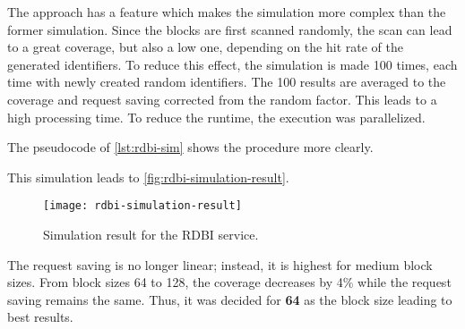 The approach has a feature which makes the simulation more complex than the former simulation. Since the blocks are first scanned randomly, the scan can lead to a great coverage, but also a low one, depending on the hit rate of the generated identifiers. To reduce this effect, the simulation is made 100 times, each time with newly created random identifiers. The 100 results are averaged to the coverage and request saving corrected from the random factor. This leads to a high processing time. To reduce the runtime, the execution was parallelized.

The pseudocode of \autoref{lst:rdbi-sim} shows the procedure more clearly.


This simulation leads to \autoref{fig:rdbi-simulation-result}.

\begin{figure}[h]
    \centering
    \texttt{[image: rdbi-simulation-result]}
    \caption{Simulation result for the RDBI service.}
    \label{fig:rdbi-simulation-result}
\end{figure}

The request saving is no longer linear; instead, it is highest for medium block sizes. From block sizes 64 to 128, the coverage decreases by 4\% while the request saving remains the same. Thus, it was decided for \textbf{64} as the block size leading to best results.


